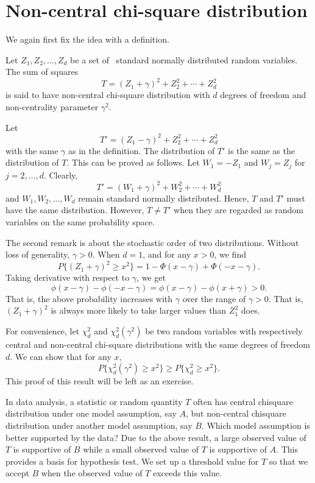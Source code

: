 \section{Non-central chi-square distribution}
We again first fix the idea with a definition.

\begin{defi}
Let $Z_1, Z_2, \ldots, Z_d$ be a set of \iid\ standard normally
distributed random variables. The sum of squares
\[
T = (Z_1 + \gamma)^2 + Z_2^2 + \cdots + Z_d^2
\]
is said to have non-central chi-square distribution with $d$ degrees of
freedom and non-centrality parameter $\gamma^2$.
\end{defi}

Let
\[
T' = (Z_1 - \gamma)^2 + Z_2^2 + \cdots + Z_d^2
\]
with the same $\gamma$ as in the definition. The distribution
of $T'$ is the same as the distribution of $T$.
This can be proved as follows. Let $W_1 = - Z_1$ and $W_j = Z_j$
for $j=2, \ldots, d$. Clearly, 
\[
T' = (W_1 + \gamma)^2 + W_2^2 + \cdots + W_d^2
\]
and $W_1, W_2, \ldots, W_d$ remain \iid standard normally
distributed. Hence, $T$ and $T'$ must have the
same distribution. However, $T \neq T'$ when they
are regarded as random variables on the same probability
space.

The second remark is about the stochastic order of two distributions.
Without loss of generality, $\gamma > 0$.
When $d=1$, and for any $x > 0$, we find
\[
P\{ (Z_1 + \gamma)^2 \geq x^2 \}
= 1 - \Phi( x - \gamma) + \Phi(- x - \gamma).
\]
Taking derivative with respect to $\gamma$, we get
\[
\phi(x - \gamma) - \phi(- x - \gamma) 
=
\phi(x - \gamma) - \phi( x + \gamma) 
> 0.
\]
That is, the above probability increases with $\gamma$
over the range of $\gamma > 0$.
That is, $(Z_1 + \gamma)^2$ is always more likely to
take larger values than $Z_1^2$ does.

For convenience, let $\chi_d^2$ and $\chi_d^2(\gamma^2)$
be two random variables with respectively central and non-central
chi-square distributions with the same degrees of freedom $d$.
We can show that for any $x$,
\[
P\{ \chi_d^2(\gamma^2) \geq x^2\}
\geq
P\{ \chi_d^2 \geq x^2\}.
\]
This proof of this result will be left as an exercise.

In data analysis, a statistic or random quantity $T$ often has
central chisquare distribution under one model assumption, say $A$, 
but non-central chisquare distribution under another model assumption,
say $B$.
Which model assumption is better supported by the data?
Due to the above result, a large observed value of $T$
is supportive of $B$ while a small observed value of $T$ is supportive
of $A$. This provides a basis for hypothesis test.
We set up a threshold value for $T$ so that we
accept $B$ when the observed value of $T$ exceeds
this value. 

